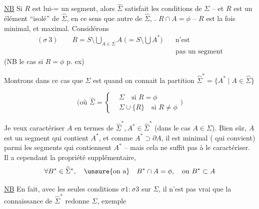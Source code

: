 \uline{NB} Si $R$ est lui-= un segment, alors  $\widehat\Sigma$ satisfait les conditions de $\Sigma$ -- et $R$ est un élément  ``isolé'' de $\widehat\Sigma$, en ce sens que   autre   de $\widehat\Sigma$, . $R\cap A=\phi$ --   $R$ est  la fois minimal, et maximal. Considérons
\[
 \begin{aligned}
 (\sigma\ 3)\qquad R=S\setminus\bigcup_{A\in\Sigma}A\;
 \bigl(=S\setminus\bigcup A^*\bigr)&\quad\text{n'est}\\
 &\quad\text{pas un segment}
 \end{aligned}
\]
(NB  le cas si $R=\phi$ p. ex)

Montrons dans ce cas que  $\Sigma$ est   quand on connait la partition $\widehat\Sigma^*=\{A^*\mid A\in\widehat\Sigma\}$

\[
 \bigl(\text{où }\widehat\Sigma=\left\{\begin{aligned}
 &\Sigma\quad\text{si }R=\phi\\
 &\Sigma\cup\{R\}\quad\text{si }R\ne\phi
 \end{aligned}\right.\bigr)
\]

Je veux caractériser $A$ en termes de $\widehat\Sigma^*, A^*\in\widehat\Sigma^*$ (dans le cas $A\in\Sigma$). Bien sûr, $A$ est un  segment qui contient $A^*$, et comme $A^*\supset\partial A$, il est minimal ( qui convient) parmi les segments  qui contiennent $A^*$ -- mais cela ne suffit pas à le caractériser. Il a cependant la propriété supplémentaire,
\[
 \forall B^*\in\widehat\Sigma^*,\quad\text{\unsure{on a}}\quad B^*\cap A=\phi,\quad\text{ou }B^*\subset A
\]

\uline{NB} En fait, avec les seules conditions $\sigma1:\sigma3$ sur $\Sigma$,  il n'est pas vrai que la connaissance de $\widehat\Sigma^*$ redonne $\Sigma$, exemple

